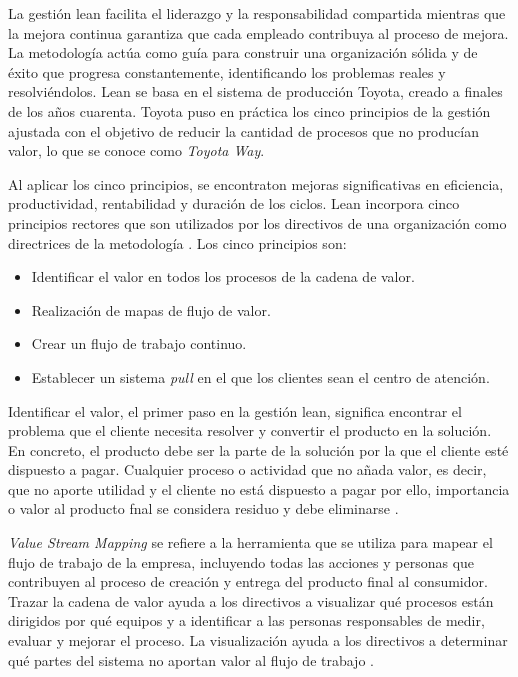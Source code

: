 La gestión lean facilita el liderazgo y la responsabilidad compartida mientras que la mejora continua garantiza que cada empleado contribuya al proceso de mejora.
La metodología actúa como guía para construir una organización sólida y de éxito que progresa constantemente, identificando los problemas reales y resolviéndolos.
Lean se basa en el sistema de producción Toyota, creado a finales de los años cuarenta.
Toyota puso en práctica los cinco principios de la gestión ajustada con el objetivo de reducir la cantidad de procesos que no producían valor, lo que se conoce como \textit{Toyota Way}.

Al aplicar los cinco principios, se encontraton mejoras significativas en eficiencia, productividad, rentabilidad y duración de los ciclos.
Lean incorpora cinco principios rectores que son utilizados por los directivos de una organización como directrices de la metodología \cite{helmold_progress_2019}. Los cinco principios son:

\begin{itemize}
    \item Identificar el valor en todos los procesos de la cadena de valor.
    \item Realización de mapas de flujo de valor.
    \item Crear un flujo de trabajo continuo.
    \item Establecer un sistema \textit{pull} en el que los clientes sean el centro de atención.
\end{itemize}

Identificar el valor, el primer paso en la gestión lean, significa encontrar el problema que el cliente necesita resolver y convertir el producto en la solución.
En concreto, el producto debe ser la parte de la solución por la que el cliente esté dispuesto a pagar.
Cualquier proceso o actividad que no añada valor, es decir, que no aporte utilidad y el cliente no está dispuesto a pagar por ello, importancia o valor al producto fnal se considera residuo y debe eliminarse \cite{liker_toyota_2006}.

\textit{Value Stream Mapping} se refiere a la herramienta que se utiliza para mapear el flujo de trabajo de la empresa, incluyendo todas las acciones y personas que contribuyen al proceso de creación y entrega del producto final al consumidor.
Trazar la cadena de valor ayuda a los directivos a visualizar qué procesos están dirigidos por qué equipos y a identificar a las personas responsables de medir, evaluar y mejorar el proceso.
La visualización ayuda a los directivos a determinar qué partes del sistema no aportan valor al flujo de trabajo \cite{slack_operations_2010}.

